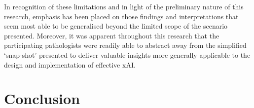 In recognition of these limitations and in light of the preliminary nature of this research, emphasis has been placed on those findings and interpretations that seem most able to be generalised beyond the limited scope of the scenario presented. Moreover, it was apparent throughout this research that the participating pathologists were readily able to abstract away from the simplified `snap-shot' presented to deliver valuable insights more generally applicable to the design and implementation of effective xAI.

\section{Conclusion}
\label{sec:Conclusion}



